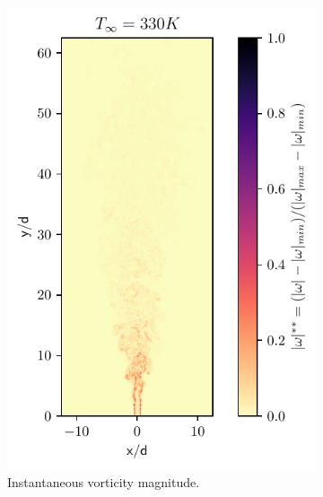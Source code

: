 \begin{figure}[htbp!]
\begin{subfigure}{0.25\textwidth}
	\centering
	\includegraphics[scale=.65]{figures/Plots/vertical/330/magvort_scaled_vert_330.pdf}
	\caption{Instantaneous vorticity magnitude.} \label{330_magvort_1}
\end{subfigure}
\hfill
\begin{subfigure}{0.25\textwidth}
	\centering

\end{subfigure}
\end{figure}
